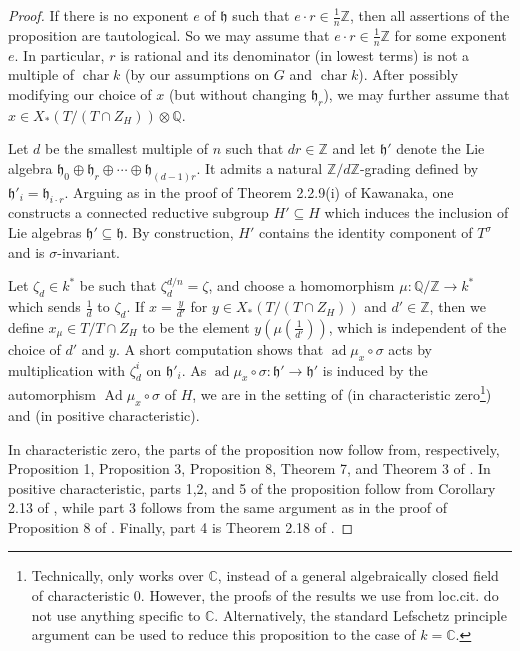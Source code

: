 \documentclass[12pt]{article}
\newcommand{\on}{\operatorname}
\theoremstyle{remark}
\begin{document}
\begin{proof}

If there is no exponent $e$ of $\mathfrak{h}$ such that $e\cdot r\in\frac{1}{n}\mathbb{Z}$, then all assertions of the proposition are tautological. So we may assume that $e\cdot r\in\frac{1}{n}\mathbb{Z}$ for some exponent $e$. In particular, $r$ is rational and its denominator (in lowest terms) is not a multiple of $\on{char} k$ (by our assumptions on $G$ and $\on{char} k$). After possibly modifying our choice of $x$ (but without changing $\mathfrak{h}_r$), we may further assume that $x\in X_*(T/(T\cap Z_H))\otimes\mathbb{Q}$.

Let $d$ be the smallest multiple of $n$ such that $dr\in\mathbb{Z}$ and let $\mathfrak{h}'$ denote the Lie algebra $\mathfrak{h}_0\oplus\mathfrak{h}_r\oplus\cdots\oplus\mathfrak{h}_{(d-1)r}.$ It admits a natural $\mathbb{Z}/d\mathbb{Z}$-grading defined by $\mathfrak{h}'_{i}=\mathfrak{h}_{i\cdot r}.$ Arguing as in the proof of Theorem 2.2.9(i) of Kawanaka\cite{kawanaka}, one constructs a connected reductive subgroup $H'\subseteq H$ which induces the inclusion of Lie algebras $\mathfrak{h}'\subseteq\mathfrak{h}.$ By construction, $H'$ contains the identity component of $T^{\sigma}$ and is $\sigma$-invariant. 

Let $\zeta_d\in k^*$ be such that $\zeta_d^{d/n}=\zeta$, and choose a homomorphism $\mu:\mathbb{Q}/\mathbb{Z}\rightarrow k^*$ which sends $\frac{1}{d}$ to $\zeta_d.$ If $x=\frac{y}{d'}$ for $y\in X_*(T/(T\cap Z_H))$ and $d'\in\mathbb{Z}$, then we define $x_{\mu}\in T/T\cap Z_H$ to be the element $y(\mu(\frac{1}{d'}))$, which is independent of the choice of $d'$ and $y$. A short computation shows that $\on{ad}\mu_x\circ\sigma$ acts by multiplication with $\zeta_d^i$ on $\mathfrak{h}'_i.$ As $\on{ad}\mu_x\circ\sigma:\mathfrak{h}'\rightarrow\mathfrak{h}'$ is induced by the automorphism $\on{Ad}\mu_x\circ\sigma$ of $H$, we are in the setting of \cite{Vinberg} (in characteristic zero\footnote{Technically, \cite{Vinberg} only works over $\mathbb{C}$, instead of a general algebraically closed field of characteristic $0$. However, the proofs of the results we use from loc.cit. do not use anything specific to $\mathbb{C}$. Alternatively, the standard Lefschetz principle argument can be used to reduce this proposition to the case of $k=\mathbb{C}$.}) and \cite{Levy} (in positive characteristic).

In characteristic zero, the parts of the proposition now follow from, respectively, Proposition 1, Proposition 3, Proposition 8, Theorem 7, and Theorem 3 of \cite{Vinberg}. In positive characteristic, parts 1,2, and 5 of the proposition follow from Corollary 2.13 of \cite{Levy}, while part 3 follows from the same argument as in the proof of Proposition 8 of \cite{Vinberg}. Finally, part 4 is Theorem 2.18 of \cite{Levy}.
\end{proof}
\end{document}
